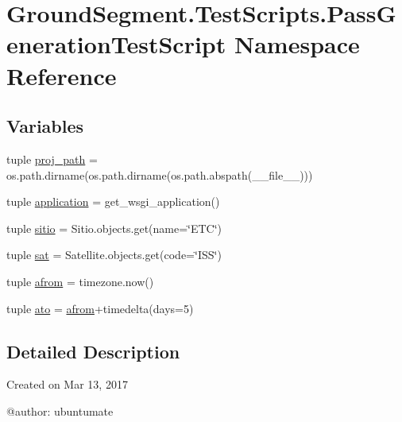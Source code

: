 \hypertarget{namespace_ground_segment_1_1_test_scripts_1_1_pass_generation_test_script}{}\section{Ground\+Segment.\+Test\+Scripts.\+Pass\+Generation\+Test\+Script Namespace Reference}
\label{namespace_ground_segment_1_1_test_scripts_1_1_pass_generation_test_script}
\subsection*{Variables}
\begin{DoxyCompactItemize}
\item 
tuple \hyperlink{namespace_ground_segment_1_1_test_scripts_1_1_pass_generation_test_script_aa6ec52465e707ade08450ea276edbaa2}{proj\+\_\+path} = os.\+path.\+dirname(os.\+path.\+dirname(os.\+path.\+abspath(\+\_\+\+\_\+file\+\_\+\+\_\+)))
\item 
tuple \hyperlink{namespace_ground_segment_1_1_test_scripts_1_1_pass_generation_test_script_a70ae739c4e375b8d77551ceb5ff5b656}{application} = get\+\_\+wsgi\+\_\+application()
\item 
tuple \hyperlink{namespace_ground_segment_1_1_test_scripts_1_1_pass_generation_test_script_ad7a55b577a0c5d1d73f8c590b27082fd}{sitio} = Sitio.\+objects.\+get(name=\char`\"{}E\+T\+C\char`\"{})
\item 
tuple \hyperlink{namespace_ground_segment_1_1_test_scripts_1_1_pass_generation_test_script_ad1929734660184b683fd73c95d4a0fe4}{sat} = Satellite.\+objects.\+get(code=\char`\"{}I\+S\+S\char`\"{})
\item 
tuple \hyperlink{namespace_ground_segment_1_1_test_scripts_1_1_pass_generation_test_script_a75fdf6b2344cc6982ff79b034f3e9ec5}{afrom} = timezone.\+now()
\item 
tuple \hyperlink{namespace_ground_segment_1_1_test_scripts_1_1_pass_generation_test_script_a1450da5336c8a08475cd8ca3f6d51448}{ato} = \hyperlink{namespace_ground_segment_1_1_test_scripts_1_1_pass_generation_test_script_a75fdf6b2344cc6982ff79b034f3e9ec5}{afrom}+timedelta(days=5)
\end{DoxyCompactItemize}


\subsection{Detailed Description}
\begin{DoxyVerb}Created on Mar 13, 2017

@author: ubuntumate
\end{DoxyVerb}
 

